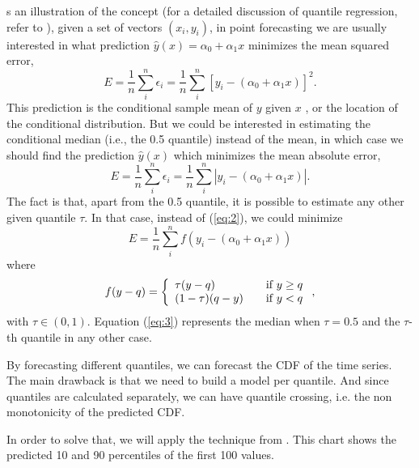 \documentclass[a4paper,twocolumn,5p]{elsarticle}
\begin{document}
s an illustration of the concept (for a detailed discussion of 
quantile regression, refer to \cite{koenker_quantile_2005}), given a 
set of vectors $(x_i, y_i)$, in point forecasting we are usually 
interested in what prediction $\hat y(x) = \alpha_0 + \alpha_1 x$
minimizes the mean squared error,
\begin{equation}
  \label{eq:1}
  E = \frac{1}{n} \sum^n_i \epsilon_i =
  \frac{1}{n} \sum^n_i [ y_i - (\alpha_0 + \alpha_1 x) ]^2.
\end{equation}
This prediction is the conditional sample mean of $y$ given $x$%
, or the location of the conditional distribution. But we could be
interested in estimating the conditional median (i.e., the 0.5
quantile) instead of the mean, in which case we should find the
prediction $\hat y(x)$ which minimizes the mean absolute error,
\begin{equation}
  \label{eq:2}
  E = \frac{1}{n} \sum^n_i \epsilon_i =
  \frac{1}{n} \sum^n_i | y_i - (\alpha_0 + \alpha_1 x) |.
\end{equation}
The fact is that, apart from the 0.5 quantile, it is possible to
estimate any other given quantile $\tau$. In that case, instead of
(\ref{eq:2}), we could minimize
\begin{equation}
  \label{eq:3}
E= \frac{1}{n} \sum^n_i f( y_i - (\alpha_0 + \alpha_1 x))
\end{equation}
where
\begin{equation}
  \label{eq:4}
  f(y-q) = \left\{ 
\begin{array}{l l}
\tau (y-q) & \quad \mbox{if $y \ge q$}\\
(1-\tau) (q-y) & \quad \mbox{if $y < q$}\\
\end{array} \right.,
\end{equation}
with $\tau \in (0,1)$. Equation (\ref{eq:3}) represents the
median when $\tau=0.5$ and the $\tau$-th quantile in any other case.

By forecasting different quantiles, we
can forecast the CDF of the time series. 
The main drawback is that we need to build a model per quantile. And since quantiles are calculated separately, 
we can have quantile crossing, i.e. the non monotonicity of the predicted CDF. 

In order to solve that, we will apply the technique from . This chart shows the predicted 10 and 90 
percentiles of the first 100 values.

\label{sec:mm}
\end{document}
